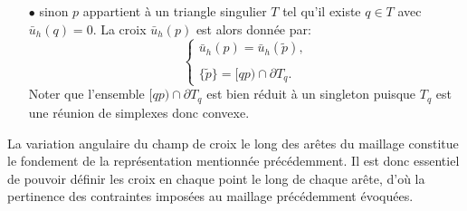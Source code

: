 \begin{itemize}
\item[$\bullet$] sinon $p$ appartient à un triangle singulier $T$ tel qu'il existe $q\in T$ avec $\bar{u}_h(q)=0$. La croix $\bar{u}_h(p)$ est alors donnée par:
$$
\left\{
\begin{array}{l}
\bar{u}_h(p)=\bar{u}_h(\widetilde{p}),\\\\
\{\widetilde{p}\}=[qp)\cap\partial T_q.
\end{array}
\right.
$$
Noter que l'ensemble $[qp)\cap\partial T_q$ est bien réduit à un singleton puisque $T_q$ est une réunion de simplexes donc convexe.
\end{itemize}

\begin{remark}
La variation angulaire du champ de croix le long des arêtes du maillage constitue le fondement de la représentation mentionnée précédemment. Il est donc essentiel de pouvoir définir les croix en chaque point le long de chaque arête, d'où la pertinence des contraintes imposées au maillage précédemment évoquées.
\end{remark}



